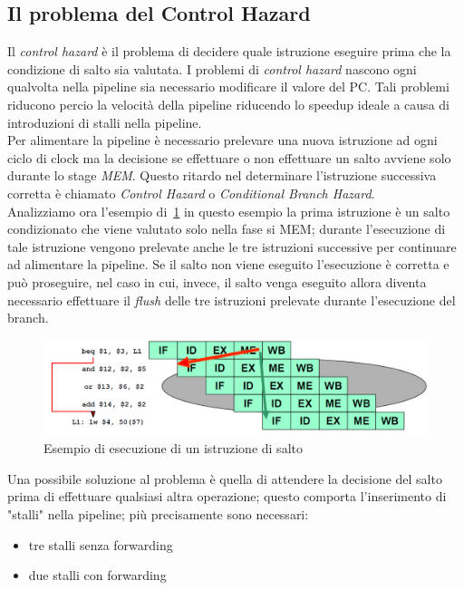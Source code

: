 \subsection{Il problema del Control Hazard}
Il \emph{control hazard} è il problema di decidere quale istruzione eseguire prima che la condizione di salto sia valutata. I problemi di \emph{control hazard} nascono ogni qualvolta nella pipeline sia necessario modificare il valore del PC. Tali problemi riducono percio la velocità della pipeline riducendo lo speedup ideale a causa di introduzioni di stalli nella pipeline.\\
Per alimentare la pipeline è necessario prelevare una nuova istruzione ad ogni ciclo di clock ma la decisione se effettuare o non effettuare un salto avviene solo durante lo stage \emph{MEM}. Questo ritardo nel determinare l'istruzione successiva corretta è chiamato \emph{Control Hazard} o \emph{Conditional Branch Hazard}.\\
Analizziamo ora l'esempio di \figurename\,\ref{fig:branchexe} in questo esempio la prima istruzione è un salto condizionato che viene valutato solo nella fase si MEM; durante l'esecuzione di tale istruzione vengono prelevate anche le tre istruzioni successive per continuare ad alimentare la pipeline. Se il salto non viene eseguito l'esecuzione è corretta e può proseguire, nel caso in cui, invece, il salto venga eseguito allora diventa necessario effettuare il \emph{flush} delle tre istruzioni prelevate durante l'esecuzione del branch.
\begin{figure}
\centering
\includegraphics[scale=0.5]{img/branchexe.png}
\caption{Esempio di esecuzione di un istruzione di salto}\label{fig:branchexe}
\end{figure}
Una possibile soluzione al problema è quella di attendere la decisione del salto prima di effettuare qualsiasi altra operazione; questo comporta l'inserimento di "stalli" nella pipeline; più precisamente sono necessari:
\begin{itemize}
\item tre stalli senza forwarding
\item due stalli con forwarding
\end{itemize}
